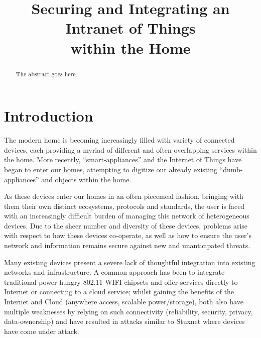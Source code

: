 \documentclass[conference]{./sty/IEEEtran}
\begin{document}
%
\title{Securing and Integrating an Intranet of Things\\ within the Home}


\author{
}

\maketitle


\begin{abstract}
The abstract goes here.
\end{abstract}


\section{Introduction}
The modern home is becoming increasingly filled with variety of connected devices, each providing a myriad of different and often overlapping services within the home. More recently, ``smart-appliances'' and the Internet of Things have began to enter our homes, attempting to digitize our already existing ``dumb-appliances'' and objects within the home. 

As these devices enter our homes in an often piecemeal fashion, bringing with them their own distinct ecosystems, protocols and standards, the user is faced with an increasingly difficult burden of managing this network of heterogeneous devices. Due to the sheer number and diversity of these devices, problems arise with respect to how these devices co-operate, as well as how to ensure the user's network and information remains secure against new and unanticipated threats.

Many existing devices present a severe lack of thoughtful integration into existing networks and infrastructure. A common approach has been to integrate traditional power-hungry 802.11 WIFI chipsets and offer services directly to Internet\cite{IETF_CORE,Xively} or connecting to a cloud service\cite{SmartThings,Twine}; whilst gaining the benefits of the Internet and Cloud (anywhere access, scalable power/storage), both also have multiple weaknesses by relying on such connectivity (reliability, security, privacy, data-ownership) and have resulted in attacks similar to Stuxnet where devices have come under attack\cite{IoTWorm}.
\end{document}
